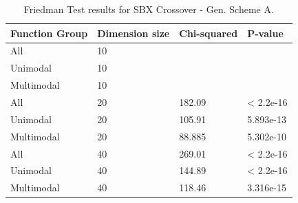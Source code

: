 \begin{table}[h]
	\centering
	\begin{tabular}{|l|l|l|l|}
		\hline
		\textbf{Function Group} & \textbf{Dimension size}      & \textbf{Chi-squared}        & \textbf{P-value}                     \\ \hline
		\multicolumn{1}{|l|}{All} & \multicolumn{1}{|l|}{10} & \multicolumn{1}{l|}{ } & \multicolumn{1}{l|}{ } \\ \hline
		\multicolumn{1}{|l|}{Unimodal} & \multicolumn{1}{|l|}{10} & \multicolumn{1}{l|}{ } & \multicolumn{1}{l|}{ } \\ \hline
		\multicolumn{1}{|l|}{Multimodal} & \multicolumn{1}{|l|}{10} & \multicolumn{1}{l|}{ } & \multicolumn{1}{l|}{ }  \\ \hline
		\hline
		\multicolumn{1}{|l|}{All} & \multicolumn{1}{|l|}{20} & \multicolumn{1}{l|}{182.09} & \multicolumn{1}{l|}{< 2.2e-16} \\ \hline
		\multicolumn{1}{|l|}{Unimodal} & \multicolumn{1}{|l|}{20} & \multicolumn{1}{l|}{105.91} & \multicolumn{1}{l|}{5.893e-13} \\ \hline
		\multicolumn{1}{|l|}{Multimodal} & \multicolumn{1}{|l|}{20} & \multicolumn{1}{l|}{88.885} & \multicolumn{1}{l|}{5.302e-10}  \\ \hline
		\hline
		\multicolumn{1}{|l|}{All} & \multicolumn{1}{|l|}{40} & \multicolumn{1}{l|}{269.01} & \multicolumn{1}{l|}{< 2.2e-16} 						\\ \hline
		\multicolumn{1}{|l|}{Unimodal} & \multicolumn{1}{|l|}{40} & \multicolumn{1}{l|}{144.89} & \multicolumn{1}{l|}{< 2.2e-16} \\ \hline
		\multicolumn{1}{|l|}{Multimodal} & \multicolumn{1}{|l|}{40} & \multicolumn{1}{l|}{118.46} & \multicolumn{1}{l|}{3.316e-15}  \\ \hline
	\end{tabular}
	\caption{Friedman Test results for SBX Crossover - Gen. Scheme A.}
	\label{Friedman_test_sbx}	
\end{table}

